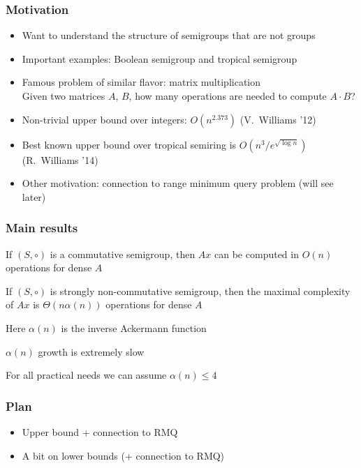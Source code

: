 \documentclass{beamer}
\begin{document}
\begin{frame}
\frametitle{Motivation}

\begin{itemize}[<+->]
\item Want to understand the structure of semigroups that are not groups
\item Important examples: Boolean semigroup and tropical semigroup
\item Famous problem of similar flavor: matrix multiplication \\
Given two matrices $A$, $B$, how many operations are needed to compute $A\cdot B$?
\item Non-trivial upper bound over integers: $O(n^{2.373})$ (V.~Williams '12)
\item Best known upper bound over tropical semiring is $O(n^3/e^{\sqrt{\log n}})$ (R.~Williams '14)
\item Other motivation: connection to range minimum query problem (will see later)
\end{itemize}


\end{frame}


\begin{frame}
\frametitle{Main results}

\begin{theorem}
If $(S,\circ)$ is a commutative semigroup, then $Ax$ can be computed in $O(n)$ operations for dense $A$
\end{theorem}

\pause

\begin{theorem}
If $(S,\circ)$ is strongly non-commutative semigroup, then the maximal complexity of $Ax$ is $\Theta(n\alpha(n))$ operations for dense $A$
\end{theorem}

\medskip
Here $\alpha(n)$ is the inverse Ackermann function

\pause
\medskip
$\alpha(n)$ growth is extremely slow

\medskip
For all practical needs we can assume $\alpha(n)\leq 4$

\end{frame}



\begin{frame}
\frametitle{Plan}

\begin{itemize}
\item Upper bound + connection to RMQ
\item A bit on lower bounds (+ connection to RMQ)
\end{itemize}



\end{frame}
\end{document}
